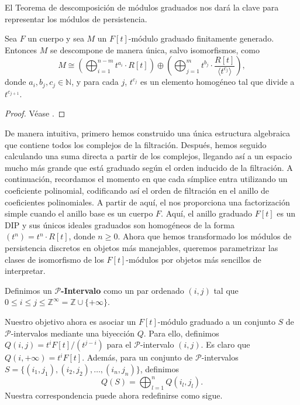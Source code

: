 El Teorema de descomposición de módulos graduados nos dará la clave para representar los módulos de persistencia.

\begin{teorema}
	\label{teo:desc-mod-grad}
	Sea $F$ un cuerpo y sea \( M \) un \( F[t] \)-módulo graduado finitamente generado. Entonces \( M \) se descompone de manera única, salvo isomorfismos, como
	\[
	M \cong \left( \bigoplus_{i=1}^{n-m} t^{a_i} \cdot R[t] \right) \oplus \left( \bigoplus_{j=1}^{m} t^{b_j} \cdot \frac{R[t]}{\langle t^{c_j} \rangle} \right),
	\]
	donde \( a_i, b_j, c_j \in \mathbb{N} \), y para cada \( j \), \( t^{c_j} \) es un elemento homogéneo tal que divide a \( t^{c_{j+1}} \).
\end{teorema}
\begin{proof}
	Véase \cite{webb1985decomposition}.
\end{proof}

De manera intuitiva, primero hemos construido una única estructura algebraica que contiene todos los complejos de la filtración. Después, hemos seguido calculando una suma directa a partir de los complejos, llegando así a un espacio mucho más grande que está graduado según el orden inducido de la filtración. A continuación, recordamos el momento en que cada símplice entra utilizando un coeficiente polinomial, codificando así el orden de filtración en el anillo de coeficientes polinomiales. A partir de aquí, el  nos proporciona una factorización simple cuando el anillo base es un cuerpo \( F \). Aquí, el anillo graduado \( F[t] \) es un DIP y sus únicos ideales graduados son homogéneos de la forma \( (t^n) = t^n \cdot R[t] \), donde \( n \geq 0 \). Ahora que hemos transformado los módulos de persistencia discretos en objetos más manejables, queremos parametrizar las clases de isomorfismo de los \( F[t] \)-módulos por objetos más sencillos de interpretar.

\begin{definicion}
	Definimos un \textbf{$\mathcal{P}$-Intervalo} como un par ordenado \( (i, j) \) tal que \( 0 \leq i \leq j \leq \mathbb{Z}^{\infty} = \mathbb{Z} \cup \{+\infty\} \).
\end{definicion}

Nuestro objetivo ahora es asociar un \( F[t] \)-módulo graduado a un conjunto \( S \) de $\mathcal{P}$-intervalos mediante una biyección \( Q \). Para ello, definimos \( Q(i, j) = t^i F[t]/(t^{j-i}) \) para el $\mathcal{P}$-intervalo \( (i, j) \). Es claro que \( Q(i, +\infty) = t^i F[t] \). Además, para un conjunto de $\mathcal{P}$-intervalos \( S = \{(i_1, j_1), (i_2, j_2), \ldots, (i_n, j_n)\} \), definimos
\[
Q(S) = \bigoplus_{l=1}^n Q(i_l, j_l).
\]
Nuestra correspondencia puede ahora redefinirse como sigue.

